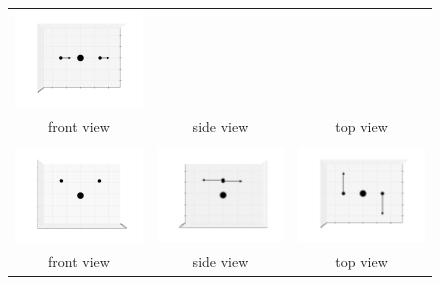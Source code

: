 \documentclass[11pt]{article}
\begin{document}
\begin{figure}[htp]
\begin{tabular}{|ccc|}
	\includegraphics[width=5.5cm,clip=true,trim=3cm 2cm 3cm 2cm]{90-0_4.pdf}\\front view&side view&top view\\\hline&&\\
	\includegraphics[width=5.5cm,clip=true,trim=3cm 2cm 3cm 2cm]{0-0_5.pdf}&
	\includegraphics[width=5.5cm,clip=true,trim=3cm 2cm 3cm 2cm]{0-90_5.pdf}&
	\includegraphics[width=5.5cm,clip=true,trim=3cm 2cm 3cm 2cm]{90-0_5.pdf}\\front view&side view&top view\\\hline
	\end{tabular}
\end{figure}
\newpage
\end{document}
